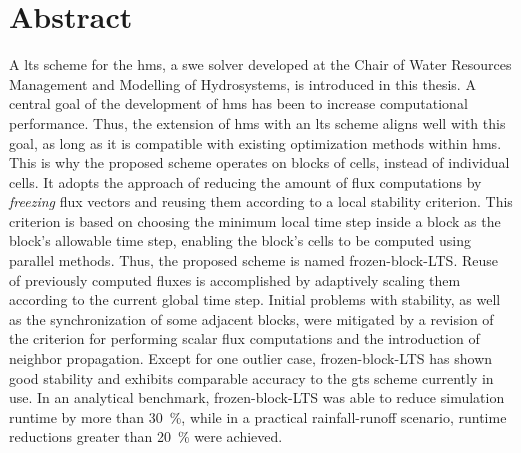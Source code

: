 \section*{Abstract}\label{sec:abstract}

A \gls{lts} scheme for the \gls{hms}, a \acrlong{swe} solver developed at the Chair of Water Resources Management and Modelling of Hydrosystems, is introduced in this thesis.
A central goal of the development of \gls{hms} has been to increase computational performance.
Thus, the extension of \gls{hms} with an \gls{lts} scheme aligns well with this goal, as long as it 
is compatible with existing optimization methods within \gls{hms}.
This is why the proposed scheme operates on blocks of cells, instead of individual cells. 
It adopts the approach of reducing the amount of flux computations by \emph{freezing} flux vectors and reusing them according to a local stability criterion. 
This criterion is based on choosing the minimum local time step inside a block as the block's allowable time step, enabling the block's cells to be computed using parallel methods.
Thus, the proposed scheme is named \acrlong*{frozen-block-LTS}.
Reuse of previously computed fluxes is accomplished by adaptively scaling them according to the current global time step.
Initial problems with stability, as well as the synchronization of some adjacent blocks, were mitigated by a revision of the criterion for performing scalar flux computations and the introduction of neighbor propagation.
Except for one outlier case, \acrlong*{frozen-block-LTS} has shown good stability and exhibits comparable accuracy to the \gls{gts} scheme currently in use.
In an analytical benchmark, \acrlong*{frozen-block-LTS} was able to reduce simulation runtime by more than \SI{30}{\percent}, while in a practical rainfall-runoff scenario, runtime reductions greater than \SI{20}{\percent} were achieved.


